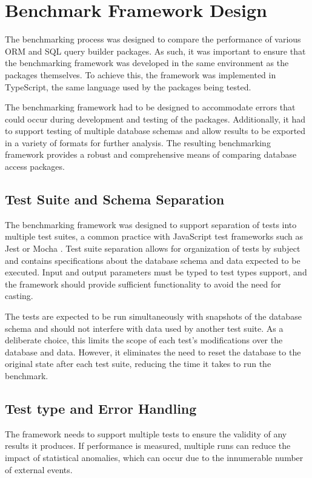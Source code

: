 \chapter{Benchmark Framework Design}

The benchmarking process was designed to compare the performance of various ORM
and SQL query builder packages. As such, it was important to ensure that the
benchmarking framework was developed in the same environment as the packages
themselves. To achieve this, the framework was implemented in TypeScript, the
same language used by the packages being tested.

The benchmarking framework had to be designed to accommodate errors that could
occur during development and testing of the packages. Additionally, it had to
support testing of multiple database schemas and allow results to be exported in
a variety of formats for further analysis. The resulting benchmarking framework
provides a robust and comprehensive means of comparing database access packages.

\section{Test Suite and Schema Separation}

The benchmarking framework was designed to support separation of tests into
multiple test suites, a common practice with JavaScript test frameworks such as
Jest \cite{Jest} or Mocha \cite{Mocha}. Test suite separation allows for
organization of tests by subject and contains specifications about the database
schema and data expected to be executed. Input and output parameters must be
typed to test types support, and the framework should provide sufficient
functionality to avoid the need for casting.

The tests are expected to be run simultaneously with snapshots of the database
schema and should not interfere with data used by another test suite. As a
deliberate choice, this limits the scope of each test's modifications over the
database and data. However, it eliminates the need to reset the database to the
original state after each test suite, reducing the time it takes to run the
benchmark.

\section{Test type and Error Handling}

The framework needs to support multiple tests to ensure the validity of any
results it produces. If performance is measured, multiple runs can reduce the
impact of statistical anomalies, which can occur due to the innumerable number
of external events.

